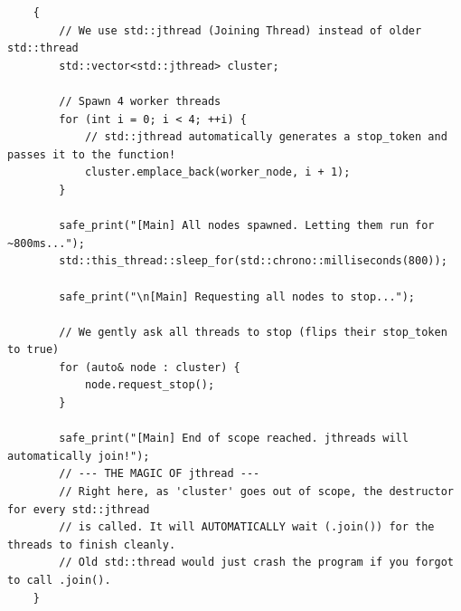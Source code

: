 \begin{verbatim}
    {
        // We use std::jthread (Joining Thread) instead of older std::thread
        std::vector<std::jthread> cluster;
        
        // Spawn 4 worker threads
        for (int i = 0; i < 4; ++i) {
            // std::jthread automatically generates a stop_token and passes it to the function!
            cluster.emplace_back(worker_node, i + 1);
        }
        
        safe_print("[Main] All nodes spawned. Letting them run for ~800ms...");
        std::this_thread::sleep_for(std::chrono::milliseconds(800));
        
        safe_print("\n[Main] Requesting all nodes to stop...");
        
        // We gently ask all threads to stop (flips their stop_token to true)
        for (auto& node : cluster) {
            node.request_stop();
        }
        
        safe_print("[Main] End of scope reached. jthreads will automatically join!");
        // --- THE MAGIC OF jthread ---
        // Right here, as 'cluster' goes out of scope, the destructor for every std::jthread 
        // is called. It will AUTOMATICALLY wait (.join()) for the threads to finish cleanly.
        // Old std::thread would just crash the program if you forgot to call .join().
    }
\end{verbatim}
